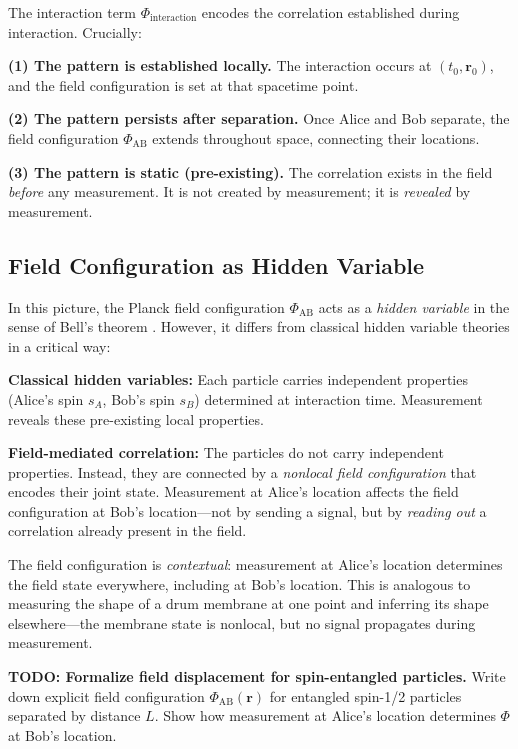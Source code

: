 \documentclass[11pt,a4paper]{article}
\theoremstyle{definition}
\theoremstyle{remark}
\begin{document}
The interaction term $\Phi_{\mathrm{interaction}}$ encodes the correlation established during interaction. Crucially:

\textbf{(1) The pattern is established locally.} The interaction occurs at $(t_0, \mathbf{r}_0)$, and the field configuration is set at that spacetime point.

\textbf{(2) The pattern persists after separation.} Once Alice and Bob separate, the field configuration $\Phi_{\mathrm{AB}}$ extends throughout space, connecting their locations.

\textbf{(3) The pattern is static (pre-existing).} The correlation exists in the field \emph{before} any measurement. It is not created by measurement; it is \emph{revealed} by measurement.

\subsection{Field Configuration as Hidden Variable}
\label{eq:field_hidden_variable}

In this picture, the Planck field configuration $\Phi_{\mathrm{AB}}$ acts as a \emph{hidden variable} in the sense of Bell's theorem \cite{Bell1964}. However, it differs from classical hidden variable theories in a critical way:

\textbf{Classical hidden variables:} Each particle carries independent properties (Alice's spin $s_A$, Bob's spin $s_B$) determined at interaction time. Measurement reveals these pre-existing local properties.

\textbf{Field-mediated correlation:} The particles do not carry independent properties. Instead, they are connected by a \emph{nonlocal field configuration} that encodes their joint state. Measurement at Alice's location affects the field configuration at Bob's location---not by sending a signal, but by \emph{reading out} a correlation already present in the field.

The field configuration is \emph{contextual}: measurement at Alice's location determines the field state everywhere, including at Bob's location. This is analogous to measuring the shape of a drum membrane at one point and inferring its shape elsewhere---the membrane state is nonlocal, but no signal propagates during measurement.

\textbf{TODO: Formalize field displacement for spin-entangled particles.} Write down explicit field configuration $\Phi_{\mathrm{AB}}(\mathbf{r})$ for entangled spin-1/2 particles separated by distance $L$. Show how measurement at Alice's location determines $\Phi$ at Bob's location.
\end{document}
